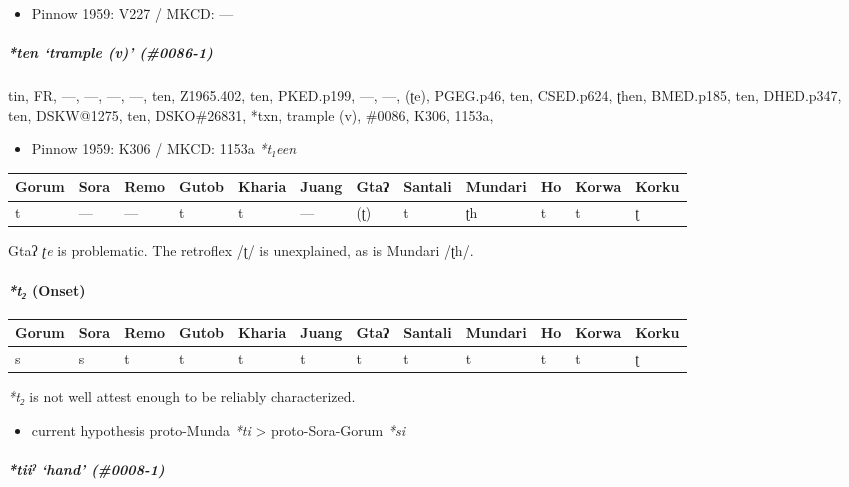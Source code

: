 \documentclass[a4paper,]{article}
\providecommand{\tightlist}{%
  \setlength{\itemsep}{0pt}\setlength{\parskip}{0pt}}
\let\oldparagraph\paragraph
\renewcommand{\paragraph}[1]{\oldparagraph{#1}\mbox{}}
\let\oldsubparagraph\subparagraph
\renewcommand{\subparagraph}[1]{\oldsubparagraph{#1}\mbox{}}
\begin{document}
\begin{itemize}
\tightlist
\item
  Pinnow 1959: V227 / MKCD: ---
\end{itemize}

\subparagraph{\texorpdfstring{\emph{*ten} `trample (v)'
(\#0086-1)}{*ten trample (v) (\#0086-1)}}\label{ten-trample-v-0086-1}

tin, FR, ---, ---, ---, ---, ten, Z1965.402, ten, PKED.p199, ---, ---,
(ʈe), PGEG.p46, ten, CSED.p624, ʈhen, BMED.p185, ten, DHED.p347, ten,
DSKW@1275, ten, DSKO\#26831, *txn, trample (v), \#0086, K306, 1153a,

\begin{itemize}
\tightlist
\item
  Pinnow 1959: K306 / MKCD: 1153a \emph{*t₁een}
\end{itemize}

\begin{longtable}[]{@{}llllllllllll@{}}
\toprule
Gorum & Sora & Remo & Gutob & Kharia & Juang & Gtaʔ & Santali & Mundari
& Ho & Korwa & Korku\tabularnewline
\midrule
\endhead
t & --- & --- & t & t & --- & (ʈ) & t & ʈh & t & t & ʈ\tabularnewline
\bottomrule
\end{longtable}

Gtaʔ \emph{ʈe} is problematic. The retroflex /ʈ/ is unexplained, as is
Mundari /ʈh/.

\paragraph{\texorpdfstring{\emph{*t₂}
(Onset)}{*t₂ (Onset)}}\label{t-onset}

\begin{longtable}[]{@{}llllllllllll@{}}
\toprule
Gorum & Sora & Remo & Gutob & Kharia & Juang & Gtaʔ & Santali & Mundari
& Ho & Korwa & Korku\tabularnewline
\midrule
\endhead
s & s & t & t & t & t & t & t & t & t & t & ʈ\tabularnewline
\bottomrule
\end{longtable}

\emph{*t₂} is not well attest enough to be reliably characterized.

\begin{itemize}
\tightlist
\item
  current hypothesis proto-Munda \emph{*ti} \textgreater{}
  proto-Sora-Gorum \emph{*si}
\end{itemize}

\subparagraph{\texorpdfstring{\emph{*tiiˀ} `hand'
(\#0008-1)}{*tiiˀ hand (\#0008-1)}}\label{tiiux2c0-hand-0008-1}
\end{document}

